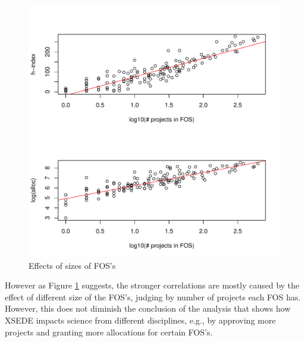 \documentclass{sig-alternate}
\begin{document}
\begin{figure}[!htb] 
  \centering 
    \includegraphics[width=1.0\columnwidth]{images/05_hindexalloc_vs_nprojects_fos_trended.pdf} 
  \caption{Effects of sizes of FOS's}\label{F:hindexalloc-vs-nprojects-fos-trended} 
\end{figure} 
 
However as Figure \ref{F:hindexalloc-vs-nprojects-fos-trended} suggests, the stronger correlations are mostly caused by the effect of different size of the FOS's, judging by number of projects each FOS has. However, this does not diminish the conclusion of the analysis that shows how XSEDE impacts science from different disciplines, e.g., by approving more projects and granting more allocations for certain FOS's. 
 
\end{document}
